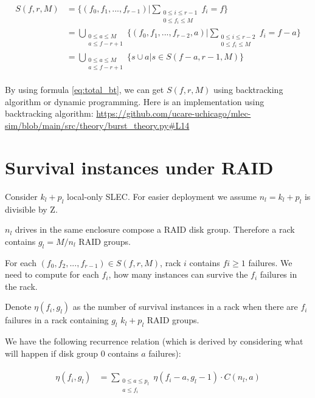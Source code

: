 \documentclass{article}
\begin{document}
\begin{eqnarray}
\begin{aligned}
  S(f,r,M)
  &= \{(f_0, f_1, ..., f_{r-1}) | \sum_{\substack{0 \leq i \leq r-1 \\ 0 \leq f_i \leq M}}f_i=f\} \\
    &= \bigcup_{\substack{0 \leq a \leq M \\ a \leq f-r+1}} \{(f_0, f_1, ..., f_{r-2}, a) | \sum_{\substack{0 \leq i \leq r-2 \\ 0 \leq f_i \leq M}}f_i=f-a\} \\
    &= \bigcup_{\substack{0 \leq a \leq M \\ a \leq f-r+1}} \{s \cup a | s \in S(f-a, r-1, M) \}
\end{aligned}
\label{eq:total_bt}
\end{eqnarray}



By using formula \ref{eq:total_bt}, we can get $S(f,r,M)$ using backtracking algorithm or dynamic programming. Here is an implementation using backtracking algorithm: \url{https://github.com/ucare-uchicago/mlec-sim/blob/main/src/theory/burst_theory.py#L14}

\section{Survival instances under RAID}

Consider $k_l+p_l$ local-only SLEC. For easier deployment we assume $n_l=k_l+p_l$ is divisible by Z.

$n_l$ drives in the same enclosure compose a RAID disk group. Therefore a rack contains $g_l = M/n_l$ RAID groups.

For each $(f_0, f_2, ..., f_{r-1}) \in S(f,r,M)$, rack $i$ contains $fi\geq1$ failures. We need to compute for each $f_i$, how many instances can survive the $f_i$ failures in the rack.

Denote $\eta(f_i, g_l)$ as the number of survival instances in a rack when there are $f_i$ failures in a rack containing $g_l$ $k_l+p_l$ RAID groups.

We have the following recurrence relation (which is derived by considering what will happen if disk group 0 contains $a$ failures):

\begin{eqnarray}
\begin{aligned}
  \eta(f_i, g_l) &= \sum_{\substack{0 \leq a \leq p_l \\ a\leq f_i}} \eta(f_i-a, g_l-1) \cdot C(n_l, a)
\end{aligned}
\label{eq:raid:1}
\end{eqnarray}
\end{document}
